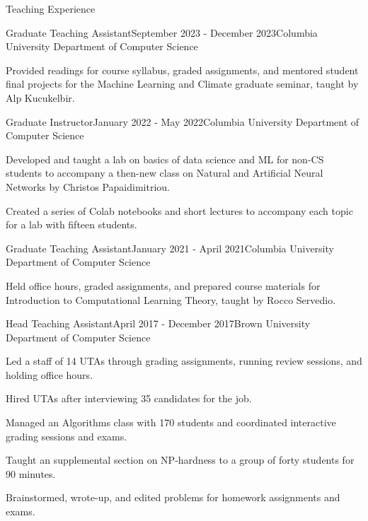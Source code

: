 \documentclass{cv} %
\begin{document}
\begin{rSection}{Teaching Experience}
\begin{rSubsection}{Graduate Teaching Assistant}{September 2023 - December 2023}{Columbia University Department of Computer Science}{}
\item Provided readings for course syllabus, graded assignments, and mentored student final projects for the Machine Learning and Climate graduate seminar, taught by Alp Kucukelbir.
\end{rSubsection}

\begin{rSubsection}{Graduate Instructor}{January 2022 - May 2022}{Columbia University Department of Computer Science}{}
\item Developed and taught a lab on basics of data science and ML for non-CS students to accompany a then-new class on Natural and Artificial Neural Networks by Christos Papaidimitriou.
\item Created a series of Colab notebooks and short lectures to accompany each topic for a lab with fifteen students.
\end{rSubsection}


\begin{rSubsection}{Graduate Teaching Assistant}{January 2021 - April 2021}{Columbia University Department of Computer Science}{}
\item Held office hours, graded assignments, and prepared course materials for Introduction to Computational Learning Theory, taught by Rocco Servedio.
\end{rSubsection}

\begin{rSubsection}{Head Teaching Assistant}{April 2017 - December 2017}{Brown University Department of Computer Science}{}
\item Led a staff of 14 UTAs through grading assignments, running review sessions, and holding office hours.
\item Hired UTAs after interviewing 35 candidates for the job.
\item Managed an Algorithms class with 170 students and coordinated interactive grading sessions and exams.
\item Taught an supplemental section on NP-hardness to a group of forty students for 90 minutes.
\item Brainstormed, wrote-up, and edited problems for homework assignments and exams. 
\end{rSubsection}


\end{rSection}
\end{document}
